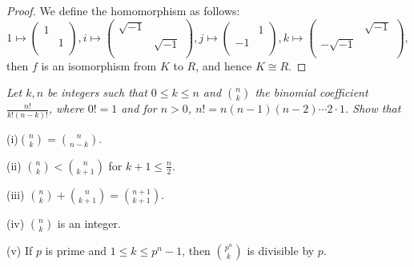 \begin{proof}
We define the homomorphism as follows:
$$
1\mapsto \left( \begin{matrix}
	1&		\\
	&		1\\
\end{matrix} \right) ,i\mapsto \left( \begin{matrix}
	\sqrt{-1}&		\\
	&		\sqrt{-1}\\
\end{matrix} \right) ,j\mapsto \left( \begin{matrix}
	&		1\\
	-1&		\\
\end{matrix} \right) ,k\mapsto \left( \begin{matrix}
	&		\sqrt{-1}\\
	-\sqrt{-1}&		\\
\end{matrix} \right) ,
$$
then $f$ is an isomorphism from $K$ to $R$, and hence $K\cong R$.
\end{proof}
\begin{problem}\em
Let $k,n$ be integers such that $0\le k\le n$ and $\binom{n}{k}$ the binomial coefficient $\frac{n!}{k!(n-k)!}$, where $0!=1$ and for $n>0$, $n!=n(n-1)(n-2)\cdots 2\cdot 1$. Show that\par

(i)$\displaystyle\binom{n}{k}=\binom{n}{n-k}$.\par
(ii) $\displaystyle\binom{n}{k}<\binom{n}{k+1}$ for $k+1\le\frac{n}{2}$.\par
(iii) $\displaystyle\binom{n}{k}+\binom{n}{k+1}=\binom{n+1}{k+1}$.\par
(iv) $\displaystyle\binom{n}{k}$ is an integer.\par
(v) If $p$ is prime and $1\le k\le p^n-1$, then $\displaystyle\binom{p^n}{k}$ is divisible by $p$.
\end{problem}
